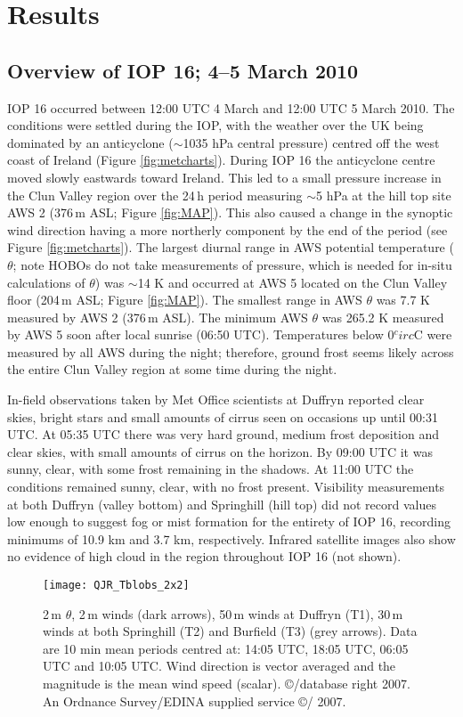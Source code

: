 \documentclass[times]{qjrms4}
\begin{document}
\section{Results}
\subsection{Overview of IOP 16; 4--5 March 2010}
IOP 16 occurred between 12:00 UTC 4 March and 12:00 UTC 5 March 2010. The conditions were settled during the IOP, with the weather over the UK being dominated by an anticyclone ($\sim$1035 hPa central pressure) centred  off the west coast of Ireland (Figure \ref{fig:metcharts}). During IOP 16 the anticyclone centre moved slowly eastwards toward Ireland. This led to a small pressure increase in the Clun Valley region over the 24$\,\mbox{h}$ period measuring $\sim$5 hPa at the hill top site AWS 2 (376$\,\mbox{m}$ ASL; Figure \ref{fig:MAP}). This also caused a change in the synoptic wind direction having a more northerly component by the end of the period (see Figure \ref{fig:metcharts}). The largest diurnal range in AWS potential temperature ($\theta$; note HOBOs do not take measurements of pressure, which is needed for in-situ calculations of $\theta$) was $\sim$14 K and occurred at AWS 5 located on the Clun Valley floor (204$\,\mbox{m}$ ASL; Figure \ref{fig:MAP}). The smallest range in AWS $\theta$ was 7.7 K measured by AWS 2 (376$\,\mbox{m}$ ASL). The minimum AWS $\theta$ was 265.2 K measured by AWS 5 soon after local sunrise (06:50 UTC). Temperatures below 0$^circ$C were measured by all AWS during the night; therefore, ground frost seems likely across the entire Clun Valley region at some time during the night.

In-field observations taken by Met Office scientists at Duffryn reported clear skies, bright stars and small amounts of cirrus seen on occasions up until 00:31 UTC. At 05:35 UTC there was very hard ground, medium frost deposition and clear skies, with small amounts of cirrus on the horizon. By 09:00 UTC it was sunny, clear, with some frost remaining in the shadows. At 11:00 UTC the conditions remained sunny, clear, with no frost present. Visibility measurements at both Duffryn (valley bottom) and Springhill (hill top) did not record values low enough to suggest fog or mist formation for the entirety of IOP 16, recording minimums of 10.9 km and 3.7 km, respectively. Infrared satellite images also show no evidence of high cloud in the region throughout IOP 16 (not shown).
        \begin{figure*}
        \centering
        \texttt{[image: QJR\_Tblobs\_2x2]}
        \caption{2$\,\mbox{m}$ $\theta$, 2$\,\mbox{m}$ winds (dark arrows), 50$\,\mbox{m}$ winds at Duffryn (T1), 30$\,\mbox{m}$ winds at both Springhill (T2) and Burfield (T3) (grey arrows). Data are 10 min mean periods centred at: 14:05 UTC, 18:05 UTC, 06:05 UTC and 10:05 UTC. Wind direction is vector averaged and the magnitude is the mean wind speed (scalar). \copyright/database right 2007. An Ordnance Survey/EDINA supplied service \copyright/ 2007.}
        \label{fig:Tblobs}
        \end{figure*}
\end{document}
